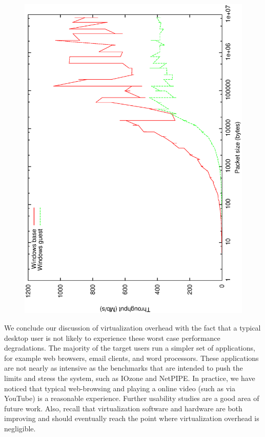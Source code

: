 \begin{figure}[tbp]
\begin{centering}
\label{fig:windows-network}
\includegraphics[scale=.7]{figs/windows-network}
\end{centering}
\end{figure}

We conclude our discussion of virtualization overhead with the fact that a typical desktop user is not likely to experience these worst case performance degradations. The majority of the target users run a simpler set of applications, for example web browsers, email clients, and word processors. These applications are not nearly as intensive as the benchmarks that are intended to push the limits and stress the system, such as IOzone and NetPIPE. In practice, we have noticed that typical web-browsing and playing a online video (such as via YouTube) is a reasonable experience. Further usability studies are a good area of future work. Also, recall that virtualization software and hardware are both improving and should eventually reach the point where virtualization overhead is negligible.

